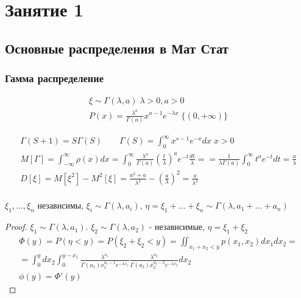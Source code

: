 \documentclass{article}
\begin{document}
\section{Занятие 1}

\subsection{Основные распределения в Мат Стат}
\subsubsection{Гамма распределение}
\begin{gather*}
  \xi \sim \Gamma(\lambda,a) \; \lambda>0,a>0 \\
  P(x)=\frac{\lambda^{a}}{\Gamma(a)}x^{a-1}e^{-\lambda x} \; \{(0,+\infty)\}
\end{gather*}

\begin{gather*}
  \Gamma(S+1)=S \Gamma(S) \qquad \Gamma(S)= \int_{0}^{\infty}x^{s-1}e^{-x}dx \; x>0 \\
  M[ \Gamma]=\int_{-\infty}^{\infty} \rho(x)dx= \int_{0}^{\infty}\frac{\lambda^{a}}{ \Gamma(a)}(\frac{t}{\lambda})^{a}e^{-t}\frac{dt}{\lambda}=
  =\frac{1}{\lambda \Gamma(a)}\int_{0}^{\infty}t^{a}e^{-t}dt=\frac{a}{\lambda} \\
  D[\xi]=M[\xi^{2}]-M^{2}[\xi]=\frac{a^2+a}{\lambda^2}-(\frac{a}{\lambda})^2=\frac{a}{\lambda^2} \\
\end{gather*}
\begin{theorem}
$\xi_1,\dots,\xi_n$ независимы, $\xi_i \sim \Gamma(\lambda,a_i)$, $\eta=\xi_1+\dots+\xi_n \sim \Gamma(\lambda,a_1+\dots+a_n)$
\end{theorem}
\begin{proof}
$\xi_1 \sim \Gamma(\lambda,a_1)$. $\xi_2 \sim \Gamma(\lambda,a_2)$ - независимые, $\eta=\xi_1+\xi_2$
\begin{gather*}
\Phi(y)=P(\eta < y)=P(\xi_2+\xi_2<y)=\iint_{x_1+x_2<y}p(x_1,x_2)dx_1dx_2= \\
=\int_{0}^{y}dx_2\int_{0}^{y-x_1}\frac{\lambda^{a_1}}{\Gamma(a_1)x_1^{a_1-1}e^{-\lambda x_1}}\frac{\lambda^{a_2}}{\Gamma(a_2)x_2^{a_2-2}e^{-\lambda x_2}}dx_2 \\
  \phi(y)=\Phi'(y)
\end{gather*}
\end{proof}
\end{document}
